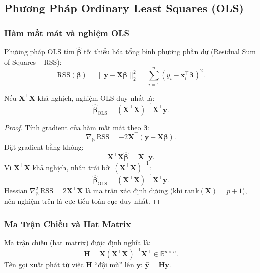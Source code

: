 \subsection{Phương Pháp Ordinary Least Squares (OLS)}

\subsubsection{Hàm mất mát và nghiệm OLS}

Phương pháp OLS tìm $\hat{\boldsymbol{\beta}}$ tối thiểu hóa tổng bình phương phần dư
(Residual Sum of Squares -- RSS):
\begin{equation}
    \mathrm{RSS}(\boldsymbol{\beta})
    = \|\mathbf{y} - \mathbf{X}\boldsymbol{\beta}\|_2^2
    = \sum_{i=1}^{n}(y_i - \mathbf{x}_i^\top \boldsymbol{\beta})^2.
\end{equation}

\begin{theorem}
Nếu $\mathbf{X}^\top\mathbf{X}$ khả nghịch, nghiệm OLS duy nhất là:
\begin{equation}
    \hat{\boldsymbol{\beta}}_{\mathrm{OLS}} = (\mathbf{X}^\top\mathbf{X})^{-1}\mathbf{X}^\top\mathbf{y}.
\end{equation}
\end{theorem}

\begin{proof}
Tính gradient của hàm mất mát theo $\boldsymbol{\beta}$:
\[
    \nabla_{\boldsymbol{\beta}}\,\mathrm{RSS} = -2\mathbf{X}^\top(\mathbf{y} - \mathbf{X}\boldsymbol{\beta}).
\]
Đặt gradient bằng không:
\[
    \mathbf{X}^\top\mathbf{X}\hat{\boldsymbol{\beta}} = \mathbf{X}^\top\mathbf{y}.
\]
Vì $\mathbf{X}^\top\mathbf{X}$ khả nghịch, nhân trái bởi $(\mathbf{X}^\top\mathbf{X})^{-1}$:
\[
    \hat{\boldsymbol{\beta}}_{\mathrm{OLS}} = (\mathbf{X}^\top\mathbf{X})^{-1}\mathbf{X}^\top\mathbf{y}.
\]
Hessian $\nabla^2_{\boldsymbol{\beta}}\,\mathrm{RSS} = 2\mathbf{X}^\top\mathbf{X}$
là ma trận xác định dương (khi $\mathrm{rank}(\mathbf{X}) = p+1$), nên nghiệm trên là
cực tiểu toàn cục duy nhất.
\end{proof}

\subsubsection{Ma Trận Chiếu và Hat Matrix}

\begin{definition}
Ma trận chiếu (hat matrix) được định nghĩa là:
\begin{equation}
    \mathbf{H} = \mathbf{X}(\mathbf{X}^\top\mathbf{X})^{-1}\mathbf{X}^\top
              \in \mathbb{R}^{n \times n}.
\end{equation}
Tên gọi xuất phát từ việc $\mathbf{H}$ ``đội mũ'' lên $\mathbf{y}$:
$\hat{\mathbf{y}} = \mathbf{H}\mathbf{y}$.
\end{definition}

